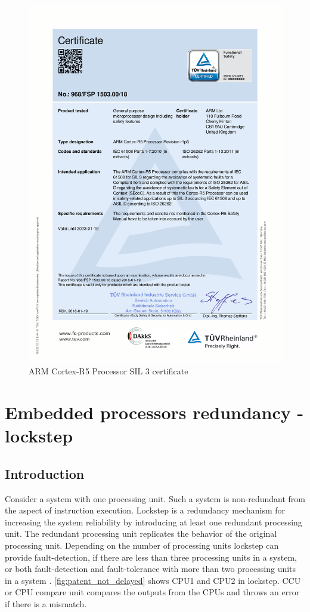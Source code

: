 \begin{figure}[H]

      \centering
      \includegraphics[width=0.9\linewidth]{images/cortex_r_certificate.pdf}
      \caption{ARM Cortex-R5 Processor  SIL 3 certificate}
      \label{fig:func_safety_certificate}
    
\end{figure}

\section{Embedded processors redundancy - lockstep}

\subsection{Introduction}

Consider a system with one processing unit. Such a system is non-redundant from the
aspect of instruction execution. Lockstep is a redundancy mechanism for increasing the system reliability
by introducing at least one redundant processing unit. The redundant processing unit replicates the behavior of
the original processing unit. Depending on the number of processing units lockstep can provide fault-detection, if there are less than three processing units in a system, or both fault-detection and
fault-tolerance with more than two processing units in a system \citep{ipavic_lockstep}. \autoref{fig:patent_not_delayed} shows CPU1 and CPU2 in lockstep. CCU or CPU compare unit compares the outputs from the CPUs and throws an error if there is a mismatch.

